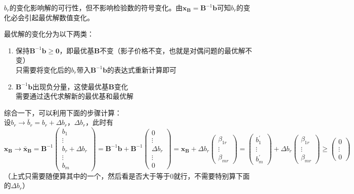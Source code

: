 \documentclass{book}
\begin{document}
$b_r$的变化影响解的可行性，但不影响检验数的符号变化。由$\boldsymbol{x_B}=\boldsymbol{B}^{-1}\boldsymbol{b}$可知$b_r$的变化必会引起最优解数值变化。

最优解的变化分为以下两类：
\begin{enumerate}
    \item 保持$\boldsymbol{B}^{-1}\boldsymbol{b}\ge\boldsymbol{0}$，即最优基$\boldsymbol{B}$不变（影子价格不变，也就是对偶问题的最优解不变）\\
    只需要将变化后的$b_r$带入$\boldsymbol{B}^{-1}\boldsymbol{b}$的表达式重新计算即可
    \item $\boldsymbol{B}^{-1}\boldsymbol{b}$出现负分量，这使最优基$\boldsymbol{B}$变化\\
    需要通过迭代求解新的最优基和最优解
\end{enumerate}
综合一下，可以利用下面的步骤计算：\\
设$b_r\rightarrow\bar{b}_r=b_r+\Delta b_r$，$\Delta b_r$，此时有$$
\boldsymbol{x_B}\rightarrow\boldsymbol{\bar{x}_B}=\boldsymbol{B}^{-1}\begin{pmatrix}
    b_1\\ \vdots\\ b_r+\Delta b_r\\ \vdots\\ b_m
\end{pmatrix}=\boldsymbol{B}^{-1}\boldsymbol{b}+\boldsymbol{B}^{-1}\begin{pmatrix}
    0\\ \vdots\\ \Delta b_r\\ \vdots\\ 0
\end{pmatrix}=\boldsymbol{x_B}+\Delta b_r\begin{pmatrix}
    \beta_{1r}\\ \vdots\\ \beta_{mr}
\end{pmatrix}=\begin{pmatrix}
    b_1^{\prime}\\ \vdots\\ b_m^{\prime}
\end{pmatrix}+\Delta b_r\begin{pmatrix}
    \beta_{1r}\\ \vdots\\ \beta_{mr}
\end{pmatrix}\ge\begin{pmatrix}
    0\\ \vdots\\ 0
\end{pmatrix}
$$
（上式只需要随便算其中的一个，然后看是否大于等于0就行，不需要特别算下面的$\Delta b_r$）
\end{document}
